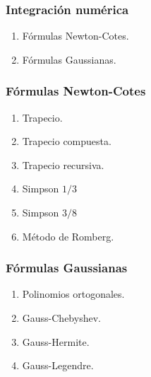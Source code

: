 \documentclass[12pt]{beamer}
\begin{document}
\begin{frame}
\frametitle{Integración numérica}
\begin{enumerate}[<+->]
\item Fórmulas Newton-Cotes.
\item Fórmulas Gaussianas.
\end{enumerate}
\end{frame}
\begin{frame}
\frametitle{Fórmulas Newton-Cotes}
\begin{enumerate}[<+->]
\item Trapecio.
\item Trapecio compuesta.
\item Trapecio recursiva.
\item Simpson $1/3$
\item Simpson $3/8$
\item Método de Romberg.
\end{enumerate}
\end{frame}
\begin{frame}
\frametitle{Fórmulas Gaussianas}
\begin{enumerate}[<+->]
\item Polinomios ortogonales.
\item Gauss-Chebyshev.
\item Gauss-Hermite.
\item Gauss-Legendre.
\end{enumerate}
\end{frame}
\end{document}
